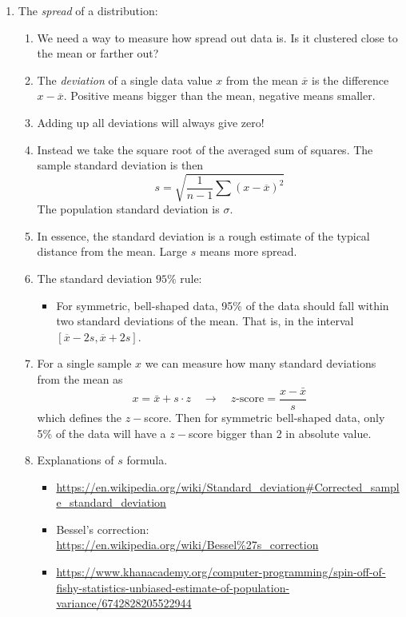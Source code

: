 \documentclass{article}
\begin{document}
\begin{enumerate}
\item The \emph{spread} of a distribution:
\begin{enumerate}
\item We need a way to measure how spread out data is. Is it clustered close to the mean or farther out?
\item The \emph{deviation} of a single data value $x$ from the mean $\overline{x}$ is the difference $x-\overline{x}$. Positive means bigger than the mean, negative means smaller.
\item Adding up all deviations will always give zero!
\item Instead we take the square root of the averaged sum of squares. The sample standard deviation is then
\[
s = \sqrt{\frac{1}{n-1} \sum (x-\overline{x})^2}
\]
The population standard deviation is $\sigma$.
\item In essence, the standard deviation is a rough estimate of the typical distance from the mean. Large $s$ means more spread. 
\item The standard deviation $95\%$ rule:
\begin{itemize}
\item For symmetric, bell-shaped data, 95\% of the data should fall within two standard deviations of the mean. That is, in the interval $[ \overline{x}-2s, \overline{x}+2s]$.
\end{itemize}
\item For a single sample $x$ we can measure how many standard deviations from the mean as
\[
x = \bar{x}+s\cdot z \quad \rightarrow \quad z\text{-score} = \frac{x-\bar{x}}{s}
\]
which defines the $z-$score. Then for symmetric bell-shaped data, only 5\% of the data will have a $z-$score bigger than 2 in absolute value.
\item Explanations of $s$ formula.
\begin{itemize}
\item \url{https://en.wikipedia.org/wiki/Standard_deviation#Corrected_sample_standard_deviation}
\item Bessel's correction: \url{https://en.wikipedia.org/wiki/Bessel%27s_correction}
\item \url{https://www.khanacademy.org/computer-programming/spin-off-of-fishy-statistics-unbiased-estimate-of-population-variance/6742828205522944}
\end{itemize}
\end{enumerate}


\end{enumerate}
\end{document}
